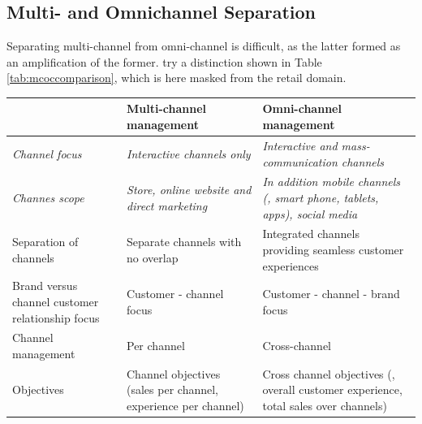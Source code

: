 \subsection{Multi- and Omnichannel Separation}
\label{app:mcoc2}
	Separating multi-channel from omni-channel is difficult, as the latter formed as an amplification of the former. \cite{vorhoef2015retail} try a distinction shown in Table \ref{tab:mcoccomparison}, which is here masked from the retail domain. 
\begin{table}[caption={Multi- and Omni-Channel Comparison}, label={tab:mcoccomparison}]
	\centering
	\begin{tabular}{p{3cm}| p{5cm} |p{5cm}} 
		& \textbf{Multi-channel management}                                   & \textbf{Omni-channel management}                                                              \\ \hline
		\textit{Channel focus}                         & \textit{Interactive channels only}                                    & \textit{Interactive and mass-communication channels}                                                   \\ \hline
		\textit{Channes scope}                                 & \textit{Store, online website and direct marketing}                          & \textit{In addition mobile channels (\ie, smart phone, tablets, apps), social media}                   \\ \hline
		{Separation of channels}                           & Separate channels with no overlap                                  & Integrated channels providing seamless customer experiences                                   \\ \hline
		{Brand versus channel customer relationship focus} & Customer - channel focus                                            & Customer - channel - brand  focus                                                              \\ \hline
		{Channel management}                               & Per channel                                                         & Cross-channel                                                                                 \\ \hline
		{Objectives}                                       & Channel objectives (\ie sales per channel, experience per channel)& Cross channel objectives (\ie, overall customer experience, total sales over channels) \\
		
	\end{tabular}
\end{table}

